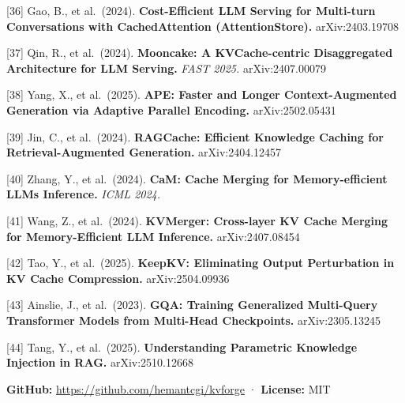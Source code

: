 {[}36{]} Gao, B., et al.~(2024). \textbf{Cost-Efficient LLM Serving for Multi-turn Conversations with CachedAttention (AttentionStore).} arXiv:2403.19708

{[}37{]} Qin, R., et al.~(2024). \textbf{Mooncake: A KVCache-centric Disaggregated Architecture for LLM Serving.} \emph{FAST 2025.} arXiv:2407.00079

{[}38{]} Yang, X., et al.~(2025). \textbf{APE: Faster and Longer Context-Augmented Generation via Adaptive Parallel Encoding.} arXiv:2502.05431

{[}39{]} Jin, C., et al.~(2024). \textbf{RAGCache: Efficient Knowledge Caching for Retrieval-Augmented Generation.} arXiv:2404.12457

{[}40{]} Zhang, Y., et al.~(2024). \textbf{CaM: Cache Merging for Memory-efficient LLMs Inference.} \emph{ICML 2024.}

{[}41{]} Wang, Z., et al.~(2024). \textbf{KVMerger: Cross-layer KV Cache Merging for Memory-Efficient LLM Inference.} arXiv:2407.08454

{[}42{]} Tao, Y., et al.~(2025). \textbf{KeepKV: Eliminating Output Perturbation in KV Cache Compression.} arXiv:2504.09936

{[}43{]} Ainslie, J., et al.~(2023). \textbf{GQA: Training Generalized Multi-Query Transformer Models from Multi-Head Checkpoints.} arXiv:2305.13245

{[}44{]} Tang, Y., et al.~(2025). \textbf{Understanding Parametric Knowledge Injection in RAG.} arXiv:2510.12668

\textbf{GitHub:} \url{https://github.com/hemantcgi/kvforge} · \textbf{License:} MIT
